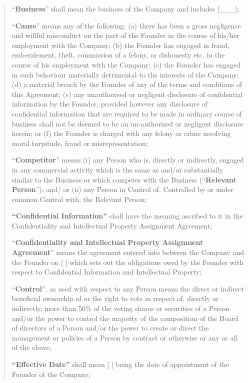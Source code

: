 \documentclass[
]{article}
\begin{document}
\begin{quote}
``\textbf{Business}'' shall mean the business of the Company and
includes {[}\_\_\_{]};

``\textbf{Cause}'' means any of the following: (a) there has been a
gross negligence and willful misconduct on the part of the Founder in
the course of his/her employment with the Company; (b) the Founder has
engaged in fraud, embezzlement, theft, commission of a felony, or
dishonesty etc. in the course of his employment with the Company; (c)
the Founder has engaged in such behaviour materially detrimental to the
interests of the Company; (d) a material breach by the Founder of any of
the terms and conditions of this Agreement; (e) any unauthorised or
negligent disclosure of confidential information by the Founder,
provided however any disclosure of confidential information that are
required to be made in ordinary course of business shall not be deemed
to be an un-authorized or negligent disclosure herein; or (f) the
Founder is charged with any felony or crime involving moral turpitude,
fraud or misrepresentation;

``\textbf{Competitor}'' means (i) any Person who is, directly or
indirectly, engaged in any commercial activity which is the same as
and/or substantially similar to the Business or which competes with the
Business (``\textbf{Relevant Person}''); and/ or (ii) any Person in
Control of, Controlled by or under common Control with, the Relevant
Person;

\textbf{``Confidential Information''} shall have the meaning ascribed to
it in the Confidentiality and Intellectual Property Assignment
Agreement;

``\textbf{Confidentiality and Intellectual Property Assignment
Agreement}'' means the agreement entered into between the Company and
the Founder on {[} {]} which sets out the obligations owed by the
Founder with respect to Confidential Information and Intellectual
Property;

``\textbf{Control}'', as used with respect to any Person means the
direct or indirect beneficial ownership of or the right to vote in
respect of, directly or indirectly, more than 50\% of the voting shares
or securities of a Person and/or the power to control the majority of
the composition of the Board of directors of a Person and/or the power
to create or direct the management or policies of a Person by contract
or otherwise or any or all of the above;

\textbf{``Effective Date''} shall mean {[} {]} being the date of
appointment of the Founder of the Company;


\end{quote}
\end{document}

